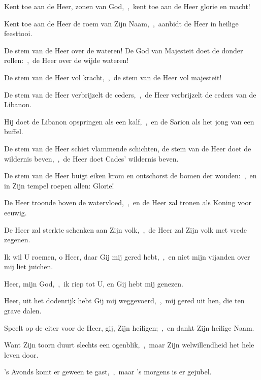 \documentclass[12pt,twoside,a5paper]{article}
\begin{document}
\begin{halfparskip}
  Kent toe aan de Heer, zonen van God,~\sep\ kent toe aan de Heer glorie en macht!


  Kent toe aan de Heer de roem van Zijn Naam,~\sep\ aanbidt de Heer in heilige feesttooi.
\end{halfparskip}


\begin{halfparskip}
  De stem van de Heer over de wateren! De God van Majesteit doet de donder rollen:~\sep\ de Heer over de wijde wateren!

  De stem van de Heer vol kracht,~\sep\ de stem van de Heer vol majesteit!

  De stem van de Heer verbrijzelt de ceders,~\sep\ de Heer verbrijzelt de ceders van de Libanon.

  Hij doet de Libanon opspringen als een kalf,~\sep\ en de Sarion als het jong van een buffel.

  De stem van de Heer schiet vlammende schichten, de stem van de Heer doet de wildernis beven,~\sep\ de Heer doet Cades' wildernis beven.

  De stem van de Heer buigt eiken krom en ontschorst de bomen der wouden:~\sep\ en in Zijn tempel roepen allen: Glorie!

  De Heer troonde boven de watervloed,~\sep\ en de Heer zal tronen als Koning voor eeuwig.

  De Heer zal sterkte schenken aan Zijn volk,~\sep\ de Heer zal Zijn volk met vrede zegenen.
\end{halfparskip}



\begin{halfparskip}
  Ik wil U roemen, o Heer, daar Gij mij gered hebt,~\sep\ en niet mijn vijanden over mij liet juichen.


  Heer, mijn God,~\sep\ ik riep tot U, en Gij hebt mij genezen.

  Heer, uit het dodenrijk hebt Gij mij weggevoerd,~\sep\ mij gered uit hen, die ten grave dalen.

  Speelt op de citer voor de Heer, gij, Zijn heiligen;~\sep\ en dankt Zijn heilige Naam.

  Want Zijn toorn duurt slechts een ogenblik,~\sep\ maar Zijn welwillendheid het hele leven door.

  's Avonds komt er geween te gast,~\sep\ maar 's morgens is er gejubel.
\end{halfparskip}
\end{document}
